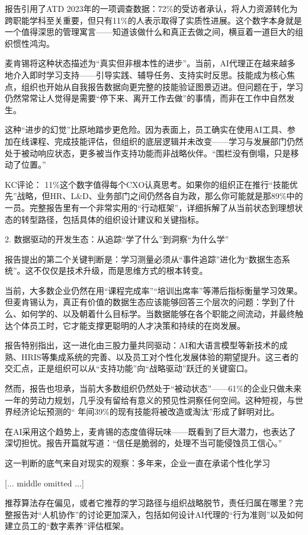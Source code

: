 \documentclass[11pt]{ctexart}
\begin{document}
报告引用了ATD 2023年的一项调查数据：72\%的受访者承认，将人力资源转化为跨职能学科至关重要，但只有11\%的人表示取得了实质性进展。这个数字本身就是一个值得深思的管理寓言——知道该做什么和真正去做之间，横亘着一道巨大的组织惯性鸿沟。

麦肯锡将这种状态描述为“真实但非根本性的进步”。当前，AI代理正在越来越多地介入即时学习支持——引导实践、辅导任务、支持实时反思。技能成为核心焦点，组织也开始从自我报告数据向更完整的技能验证图景迈进。但问题在于，学习仍然常常让人觉得是需要“停下来、离开工作去做”的事情，而非在工作中自然发生。

这种“进步的幻觉”比原地踏步更危险。因为表面上，员工确实在使用AI工具、参加在线课程、完成技能评估，但组织的底层逻辑并未改变——学习与发展部门仍然处于被动响应状态，更多被当作支持功能而非战略伙伴。“围栏没有倒塌，只是移动了位置。”

KC评论： 11\%这个数字值得每个CXO认真思考。如果你的组织正在推行“技能优先”战略，但HR、L\&D、业务部门之间仍然各自为政，那么你可能就是那89\%中的一员。完整报告里有一个非常实用的“行动框架”，详细拆解了从当前状态到理想状态的转型路径，包括具体的组织设计建议和关键指标。

2. 数据驱动的开发生态：从追踪“学了什么”到洞察“为什么学”

报告提出的第二个关键判断是：学习测量必须从“事件追踪”进化为“数据生态系统”。这不仅仅是技术升级，而是思维方式的根本转变。

当前，大多数企业仍然在用“课程完成率”“培训出席率”等滞后指标衡量学习效果。但麦肯锡认为，真正有价值的数据生态应该能够回答三个层次的问题：学到了什么、如何学的、以及朝着什么目标学。当数据能够在各个职能之间流动，并最终触达个体员工时，它才能支撑更聪明的人才决策和持续的在岗发展。

报告特别指出，这一进化由三股力量共同驱动：AI和大语言模型等新技术的成熟、HRIS等集成系统的完善、以及员工对个性化发展体验的期望提升。这三者的交汇点，正是组织可以从“支持功能”向“战略驱动”跃迁的关键窗口。

然而，报告也坦承，当前大多数组织仍然处于“被动状态”——61\%的企业只做未来一年的劳动力规划，几乎没有留给有意义的预见性洞察任何空间。这种短视，与世界经济论坛预测的“ 年间39\%的现有技能将被改造或淘汰”形成了鲜明对比。

在AI采用这个趋势上，麦肯锡的态度值得玩味——既看到了巨大潜力，也表达了深切担忧。报告开篇就写道：“信任是脆弱的，处理不当可能侵蚀员工信心。”

这一判断的底气来自对现实的观察：多年来，企业一直在承诺个性化学习

[... middle omitted ...]

推荐算法存在偏见，或者它推荐的学习路径与组织战略脱节，责任归属在哪里？完整报告对“人机协作”的讨论更加深入，包括如何设计AI代理的“行为准则”以及如何建立员工的“数字素养”评估框架。
\end{document}
